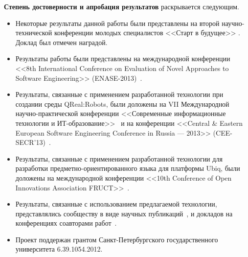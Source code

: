 \textbf{Степень достоверности и апробация результатов} раскрывается следующим.
\begin{itemize}
	\item Некоторые результаты данной работы были представлены на второй 
		научно-технической конференции молодых специалистов <<Старт в будущее>> 
		\cite{kuzenkova2011metamodeling2}. Доклад был отмечен наградой.
	\item Результаты работы были представлены на международной конференции 
		<<8th International Conference on Evaluation of Novel Approaches to Software Engineering>> 
		(ENASE-2013)~.
	\item Результаты, связанные с применением разработанной технологии при 
		создании среды QReal:Robots, были доложены на VII Международной 
		научно-практической конференции <<Современные информационные технологии 
		и ИТ-образование>>~\cite{litvinov2012robots} и на конференции <<Central \& Eastern European
		Software Engineering Conference in Russia --- 2013>> (CEE-SECR'13)~\cite{terekhov2013secr}.
	\item Результаты, связанные с применением разработанной технологии для 
		разработки предметно-ориентированного языка для платформы Ubiq, были доложены 
		на международной конференции <<10th Conference of Open Innovations 
		Association FRUCT>>~\cite{bryksin2011ubiq}.
	\item Результаты, связанные с использованием предлагаемой технологии,
		представлялись сообществу в виде научных публикаций~, \cite{osechkina2010gestures, terekhov2009architecture}
		и докладов на конференциях соавторами работ~\cite{terekhov2013robots, kuzenkova2013refactoring,
		osechkina2012multistroke, bryksin2011qreal, kuzenkova2011metamodeling, bryksin2011robots}.
	\item Проект поддержан грантом Санкт-Петербургского государственного университета 6.39.1054.2012.
\end{itemize}

